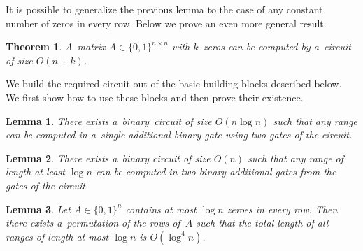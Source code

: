 \documentclass[11pt,letterpaper]{article}
\newtheorem{lemma}{Lemma}
\newtheorem{theorem}{Theorem}
\begin{document}
It is possible to generalize the previous lemma to the case of
any constant number of zeros in every row. Below we prove
an even more general result.

\begin{theorem}\label{thm:main}
A~matrix $A \in \{0,1\}^{n \times n}$ with $k$~zeros can
be computed by a~circuit of size $O(n+k)$.
\end{theorem}

We build the required circuit out of the basic building blocks described below. We first show how to use these blocks and then prove their existence.

\begin{lemma}\label{lemma:decompose}
There exists a~binary~circuit of size $O(n\log n)$ such that
any range can be computed in a~single additional binary gate
using two gates of the circuit.
\end{lemma}

\begin{lemma}\label{lemma:blocks}
There exists a~binary circuit of size $O(n)$ such that any range
of length at least $\log n$ can be computed in two binary
additional gates from the gates of the circuit.
\end{lemma}

\begin{lemma}\label{lemma:permute}
Let $A \in \{0,1\}^n$ contains at most $\log n$ zeroes in
every row. Then there exists a~permutation of the rows of~$A$
such that the total length of all ranges of length
at most $\log n$ is $O(\log^4 n)$.
\end{lemma}
\end{document}
